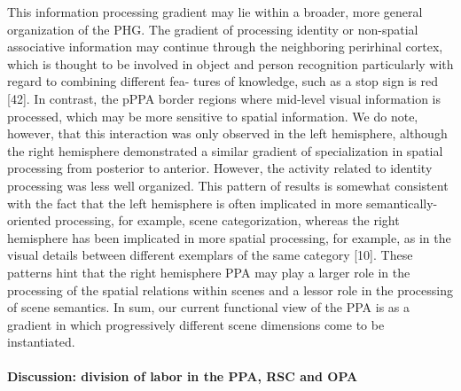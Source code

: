 \documentclass[english]{article}
\begin{document}
%
This information processing gradient may lie within a broader, more general
organization of the PHG\citep{aminoff2015associative}.
%
The gradient of processing identity or non-spatial associative information may
continue through the neighboring perirhinal cortex, which is thought to be
involved in object and person recognition particularly with regard to combining
different fea- tures of knowledge, such as a stop sign is red
[42]\citep{aminoff2015associative}.
%
In contrast, the pPPA border regions where mid-level visual information is
processed, which may be more sensitive to spatial
information\citep{aminoff2015associative}.
%
We do note, however, that this interaction was only observed in the left
hemisphere, although the right hemisphere demonstrated a similar gradient of
specialization in spatial processing from posterior to
anterior\citep{aminoff2015associative}.
%
However, the activity related to identity processing was less well organized.
This pattern of results is somewhat consistent with the fact that the left
hemisphere is often implicated in more semantically-oriented processing, for
example, scene categorization, whereas the right hemisphere has been implicated
in more spatial processing, for example, as in the visual details between
different exemplars of the same category [10]\citep{aminoff2015associative}.
%
These patterns hint that the right hemisphere PPA may play a larger role in the
processing of the spatial relations within scenes and a lessor role in the
processing of scene semantics\citep{aminoff2015associative}.
%
In sum, our current functional view of the PPA is as a gradient in which
progressively different scene dimensions come to be
instantiated\citep{aminoff2015associative}.


\paragraph{Discussion: division of labor in the PPA, RSC and OPA}
\end{document}
